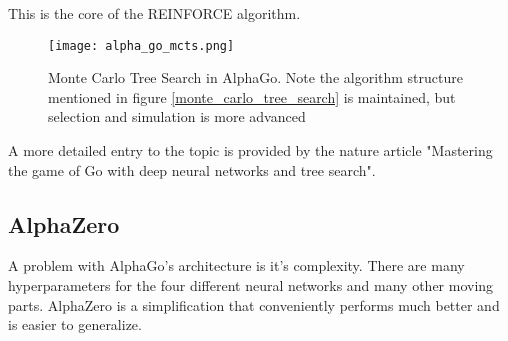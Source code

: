 This is the core of the REINFORCE algorithm. \cite{williams_simple_nodate}
\begin{figure}
    \centering
    \texttt{[image: alpha\_go\_mcts.png]}
    \caption{Monte Carlo Tree Search in AlphaGo. \cite{silver_mastering_2016} Note the algorithm structure mentioned in figure \ref{monte_carlo_tree_search} is maintained, but selection and simulation is more advanced}
    \label{alpha_go_mcts}
\end{figure}

A more detailed entry to the topic is provided by the nature article "Mastering the game of Go with deep neural networks and tree search". \cite{silver_mastering_2016}

\subsection{AlphaZero}
A problem with AlphaGo's architecture is it's complexity. There are many hyperparameters for the four different neural networks and many other moving parts. AlphaZero is a simplification that conveniently performs much better and is easier to generalize.